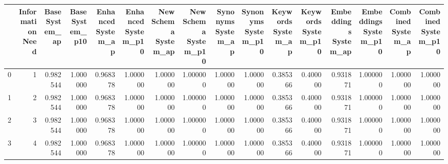 \begin{tabular}{lrrrrrrrrrrrrrrr}
\toprule
 & Information Need & Base System_ap & Base System_p10 & Enhanced System_ap & Enhanced System_p10 & New Schema System_ap & New Schema System_p10 & Synonyms System_ap & Synonyms System_p10 & Keywords System_ap & Keywords System_p10 & Embeddings System_ap & Embeddings System_p10 & Combined System_ap & Combined System_p10 \\
\midrule
0 & 1 & 0.982544 & 1.000000 & 0.968378 & 1.000000 & 1.000000 & 1.000000 & 1.000000 & 1.000000 & 0.385366 & 0.400000 & 0.931871 & 1.000000 & 1.000000 & 1.000000 \\
1 & 2 & 0.982544 & 1.000000 & 0.968378 & 1.000000 & 1.000000 & 1.000000 & 1.000000 & 1.000000 & 0.385366 & 0.400000 & 0.931871 & 1.000000 & 1.000000 & 1.000000 \\
2 & 3 & 0.982544 & 1.000000 & 0.968378 & 1.000000 & 1.000000 & 1.000000 & 1.000000 & 1.000000 & 0.385366 & 0.400000 & 0.931871 & 1.000000 & 1.000000 & 1.000000 \\
3 & 4 & 0.982544 & 1.000000 & 0.968378 & 1.000000 & 1.000000 & 1.000000 & 1.000000 & 1.000000 & 0.385366 & 0.400000 & 0.931871 & 1.000000 & 1.000000 & 1.000000 \\
\bottomrule
\end{tabular}
